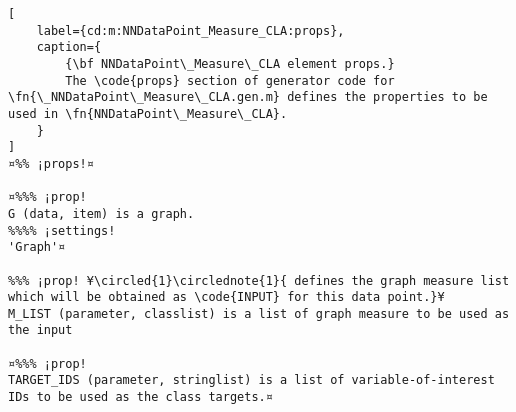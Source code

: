 \documentclass{tufte-handout}
\begin{document}
\begin{lstlisting}[
	label={cd:m:NNDataPoint_Measure_CLA:props},
	caption={
		{\bf NNDataPoint\_Measure\_CLA element props.}
		The \code{props} section of generator code for \fn{\_NNDataPoint\_Measure\_CLA.gen.m} defines the properties to be used in \fn{NNDataPoint\_Measure\_CLA}.
	}
]
¤%% ¡props!¤

¤%%% ¡prop!  
G (data, item) is a graph.
%%%% ¡settings!
'Graph'¤

%%% ¡prop! ¥\circled{1}\circlednote{1}{ defines the graph measure list which will be obtained as \code{INPUT} for this data point.}¥
M_LIST (parameter, classlist) is a list of graph measure to be used as the input

¤%%% ¡prop!
TARGET_IDS (parameter, stringlist) is a list of variable-of-interest IDs to be used as the class targets.¤

\end{lstlisting}

\clearpage
\end{document}
